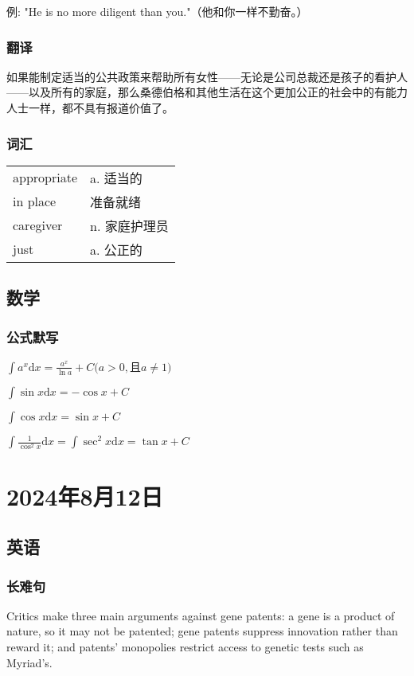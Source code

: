 \documentclass[UTF8]{ctexart}
\begin{document}
例: "He is no more diligent than you."（他和你一样不勤奋。）
\subsubsection{翻译}
如果能制定适当的公共政策来帮助所有女性——无论是公司总裁还是孩子的看护人——以及所有的家庭，那么桑德伯格和其他生活在这个更加公正的社会中的有能力人士一样，都不具有报道价值了。
\subsubsection{词汇}
\begin{table}[h]
      \centering
      \begin{tabular}{p{}p{}}
            appropriate & a. 适当的   \\
            in place    & 准备就绪     \\
            caregiver   & n. 家庭护理员 \\
            just        & a. 公正的
      \end{tabular}
\end{table}

\subsection{数学}
\subsubsection{公式默写}
\begin{multicols}{2}
      $\int a^x\mathrm{d}x=\frac{a^x}{\ln a}+C(a>0,$且$a\ne1)$

      $\int\sin x\mathrm{d}x=-\cos x+C$

      $\int\cos x\mathrm{d}x=\sin x+C$

      $\int\frac{1}{\cos^2x}\mathrm{d}x=\int\sec^2x\mathrm{d}x=\tan x+C$
\end{multicols}
\section{2024年8月12日}
\subsection{英语}
\subsubsection{长难句}
Critics make three main arguments against gene patents: a gene is a product of nature, so it may not be patented; gene patents suppress innovation rather than reward it; and patents' monopolies restrict access to genetic tests such as Myriad's.
\end{document}
